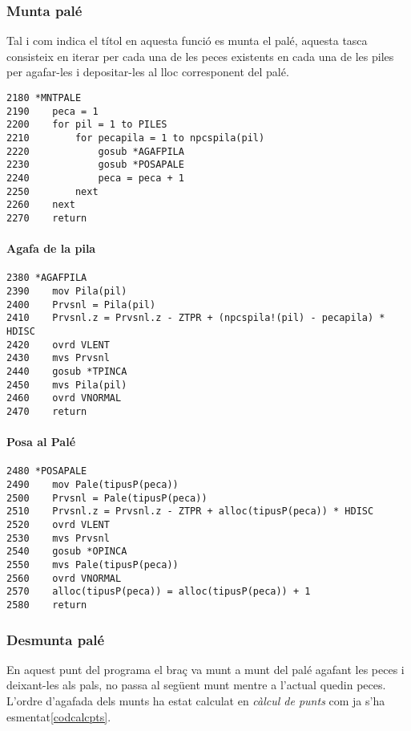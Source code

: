 \subsubsection{Munta palé}
Tal i com indica el títol en aquesta funció es munta el palé, aquesta tasca
consisteix en iterar per cada una de les peces existents en cada una de les
piles per agafar-les i depositar-les al lloc corresponent del palé.

\begin{verbatim}
2180 *MNTPALE
2190    peca = 1
2200    for pil = 1 to PILES 
2210        for pecapila = 1 to npcspila(pil)
2220            gosub *AGAFPILA
2230            gosub *POSAPALE
2240            peca = peca + 1
2250        next
2260    next
2270    return
\end{verbatim}

\paragraph{Agafa de la pila}
\begin{verbatim}
2380 *AGAFPILA
2390    mov Pila(pil)
2400    Prvsnl = Pila(pil)
2410    Prvsnl.z = Prvsnl.z - ZTPR + (npcspila!(pil) - pecapila) * HDISC
2420    ovrd VLENT
2430    mvs Prvsnl
2440    gosub *TPINCA
2450    mvs Pila(pil)
2460    ovrd VNORMAL
2470    return
\end{verbatim}

\paragraph{Posa al Palé}
\begin{verbatim}
2480 *POSAPALE
2490    mov Pale(tipusP(peca))
2500    Prvsnl = Pale(tipusP(peca))
2510    Prvsnl.z = Prvsnl.z - ZTPR + alloc(tipusP(peca)) * HDISC
2520    ovrd VLENT
2530    mvs Prvsnl
2540    gosub *OPINCA
2550    mvs Pale(tipusP(peca))
2560    ovrd VNORMAL
2570    alloc(tipusP(peca)) = alloc(tipusP(peca)) + 1
2580    return
\end{verbatim}

\subsubsection{Desmunta palé}
En aquest punt del programa el braç va munt a munt del palé agafant les peces
i deixant-les als pals, no passa al següent munt mentre a l'actual quedin peces.
L'ordre d'agafada dels munts ha estat calculat en \emph{càlcul de punts} com ja s'ha
esmentat\ref{codcalcpts}.

